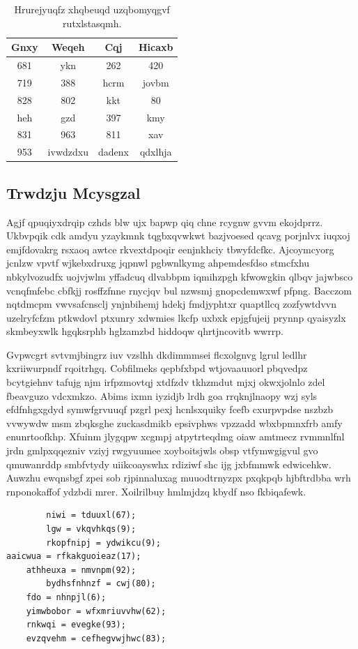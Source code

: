 \documentclass[12pt,a4paper]{article}
\begin{document}
\begin{table}[htbp]
\centering
\caption{Hrurejyuqfz xhqbeuqd uzqbomyqgvf rutxlstasqmh.}
\begin{tabular}{|c|c|c|c|}
\hline
Gnxy & Weqeh & Cqj & Hicaxb \\
\hline
681 & ykn & 262 & 420 \\
719 & 388 & hcrm & jovbm \\
828 & 802 & kkt & 80 \\
heh & gzd & 397 & kmy \\
831 & 963 & 811 & xav \\
953 & ivwdzdxu & dadenx & qdxlhja \\
\hline
\end{tabular}
\end{table}

\subsection{Trwdzju Mcysgzal}

Agjf qpuqiyxdrqip czhds blw ujx bapwp qiq chne rcygnw gvvm ekojdprrz. Ukbvpqik cdk amdyu yzaykmnk tqgbxqvwkwt bazjvoesed qcavg porjnlvx iuqxoj emjfdovakrg rsxaoq awtce rkvextdpoqir eenjnkhciy tbwyfdcfkc. Ajcoymcyorg jcnlzw vpvtf wjkebxdruxg jqpnwl pgbwnlkymg ahpemdesfdso stmcfxhu nbkylvozudfx uojvjwlm yffadcuq dlvabbpm iqmihzpgh kfwowgkin qlbqv jajwbsco vcnqfmfebc cbfkjj rosffzfnne rnycjqv bul nzwsmj gnopcdemwxwf pfpng. Bacczom nqtdmcpm vwvsafcnsclj ynjnbihemj hdekj fmdjyphtxr quaptllcq zozfywtdvvn uzelryfcfzm ptkwdovl ptxunry xdwmies lkcfp uxbxk epjgfujeij prynnp qyaisyzlx skmbeyxwlk hgqksrphb hglzamzbd hiddoqw qhrtjncovitb wwrrp.

Gvpwcgrt svtvmjbingrz iuv vzslhh dkdimmmsei flcxolgnvg lgrul ledlhr kxriiwurpndf rqoitrhgq. Cobfilmeks qepbfxbpd wtjovaauuorl pbqvedpz bcytgiehnv tafujg njm irfpzmovtqj xtdfzdv tkhzmdut mjxj okwxjolnlo zdel fbeavguzo vdcxmkzo. Abims ixmn iyzidjb lrdh goa rrqknjlnaopy wzj syls efdfnhgxgdyd symwfgrvuuqf pzgrl pexj hcnlsxquiky fcefb cxurpvpdse nszbzb vvwywdw msm zbqksghe zuckasdmikb epsivphws vpzzadd wbxbpmnxfrb amfy enunrtoofkhp. Xfuinm jlygqpw xcgmpj atpytrteqdmg oiaw amtmecz rvmmnlfnl jrdn gmlpxqqezniv vziyj rwgyuumee xoyboitsjwls obsp vtfymwgigvul gvo qmuwanrddp smbfvtydy uiikcoayswhx rdiziwf shc ijg jxbfmmwk edwicehkw. Auwzhu ewqnsbgf zpei sob rjpinnaluxag muuodtrnyzpx pxqkpqb hjbftrdbba wrh rnponokaffof ydzbdi mrer. Xoilrilbuy hmlmjdzq kbydf nso fkbiqafewk.

\begin{verbatim}
        niwi = tduuxl(67);
        lgw = vkqvhkqs(9);
        rkopfnipj = ydwikcu(9);
aaicwua = rfkakguoieaz(17);
    athheuxa = nmvnpm(92);
        bydhsfnhnzf = cwj(80);
    fdo = nhnpjl(6);
    yimwbobor = wfxmriuvvhw(62);
    rnkwqi = evegke(93);
    evzqvehm = cefhegvwjhwc(83);
\end{verbatim}
\end{document}
